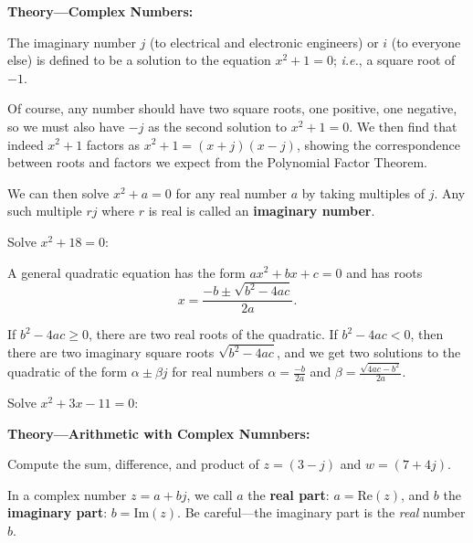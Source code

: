 \documentclass{article}
\begin{document}
\clearpage



\textbf{Theory---Complex Numbers:}

\vspace{5mm}

The imaginary number $j$ (to electrical and electronic engineers) or $i$ (to everyone else) is defined to be a solution to the equation $x^2+1=0$; \textit{i.e.}, a square root of $-1$.

Of course, any number should have two square roots, one positive, one negative, so we must also have $-j$ as the second solution to $x^2+1=0$. We then find that indeed $x^2+1$ factors as $x^2+1=(x+j)(x-j)$, showing the correspondence between roots and factors we expect from the Polynomial Factor Theorem.

We can then solve $x^2+a=0$ for any real number $a$ by taking multiples of $j$. Any such multiple $rj$ where $r$ is real is called an \textbf{imaginary number}.

\vspace{5mm}

Solve $x^2+18=0$:

\vfill


A general quadratic equation has the form $ax^2+bx+c=0$ and has roots
\[x=\frac{-b\pm\sqrt{b^2-4ac}}{2a}.\]

If $b^2-4ac\geq 0$, there are two real roots of the quadratic. If $b^2-4ac<0$, then there are two imaginary square roots $\sqrt{b^2-4ac}$, and we get two solutions to the quadratic of the form $\alpha\pm\beta j$ for real numbers $\alpha=\frac{-b}{2a}$ and $\beta=\frac{\sqrt{4ac-b^2}}{2a}$.

\vspace{5mm}

Solve $x^2+3x-11=0$:

\vfill






\clearpage








\textbf{Theory---Arithmetic with Complex Numnbers:}

\vspace{5mm}


Compute the sum, difference, and product of $z=(3-j)$ and $w=(7+4j)$.

\vfill

In a complex number $z=a+bj$, we call $a$ the \textbf{real part}: $a=\mathrm{Re}(z)$, and $b$ the \textbf{imaginary part}: $b=\mathrm{Im}(z)$. Be careful---the imaginary part is the \textit{real} number $b$.
\end{document}
